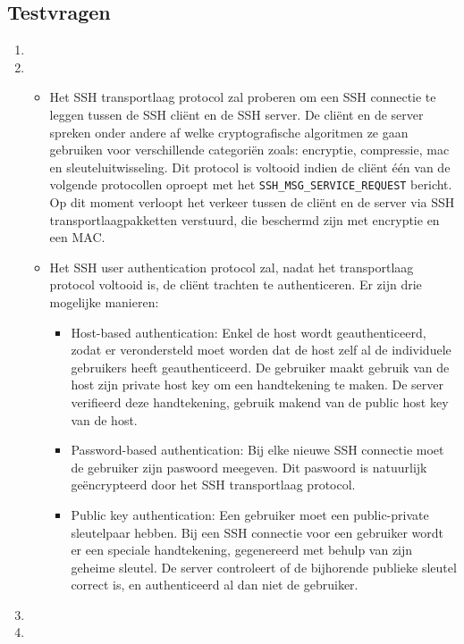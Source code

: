 \documentclass{report}
\begin{document}
	\subsection{Testvragen}
	\begin{enumerate}
		\item {}

		\item {}

		\begin{itemize}
			\item[\info] Het SSH transportlaag protocol zal proberen om een SSH connectie te leggen tussen de SSH cliënt en de SSH server. De cliënt en de server spreken onder andere af welke cryptografische algoritmen ze gaan gebruiken voor verschillende categoriën zoals: encryptie, compressie, mac en sleuteluitwisseling. Dit protocol is voltooid indien de cliënt één van de volgende protocollen oproept met het \texttt{SSH\_MSG\_SERVICE\_REQUEST} bericht. Op dit moment verloopt het verkeer tussen de cliënt en de server via SSH transportlaagpakketten verstuurd, die beschermd zijn met encryptie en een MAC.
			
			\item[\info] Het SSH user authentication protocol zal, nadat het transportlaag protocol voltooid is, de cliënt trachten te authenticeren. Er zijn drie mogelijke manieren:
			\begin{itemize}
				\item Host-based authentication: Enkel de host wordt geauthenticeerd, zodat er verondersteld moet worden dat de host zelf al de individuele gebruikers heeft geauthenticeerd. De gebruiker maakt gebruik van de host zijn private host key om een handtekening te maken. De server verifieerd deze handtekening, gebruik makend van de public host key van de host.
				\item Password-based authentication: Bij elke nieuwe SSH connectie moet de gebruiker zijn paswoord meegeven. Dit paswoord is natuurlijk geëncrypteerd door het SSH transportlaag protocol.
				\item Public key authentication: Een gebruiker moet een public-private sleutelpaar hebben. Bij een SSH connectie voor een gebruiker wordt er een speciale handtekening, gegenereerd met behulp van zijn geheime sleutel. De server controleert of de bijhorende publieke sleutel correct is, en authenticeerd al dan niet de gebruiker.
			\end{itemize}
		\end{itemize}
		\item {}
		\item {}
		                                    

\end{enumerate}
\end{document}
